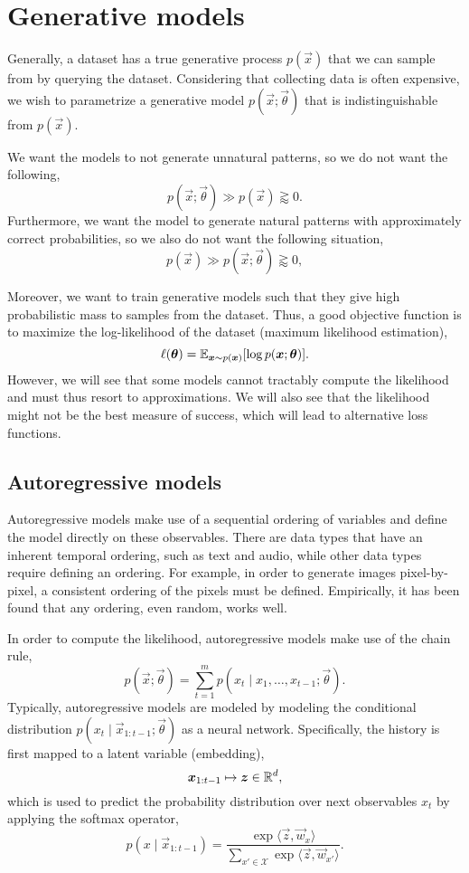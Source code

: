 \section{Generative models}

Generally, a dataset has a true generative process $p(\vec{x})$ that we can sample from by querying
the dataset. Considering that collecting data is often expensive, we wish to parametrize a
generative model $p(\vec{x}; \vec{\theta})$ that is indistinguishable from $p(\vec{x})$.

We want the models to not generate unnatural patterns, so we do not want the following, \[
    p(\vec{x}; \vec{\theta}) \gg p(\vec{x}) \gtrapprox 0.
\]
Furthermore, we want the model to generate natural patterns with approximately correct
probabilities, so we also do not want the following situation, \[
    p(\vec{x}) \gg p(\vec{x}; \vec{\theta}) \gtrapprox 0,
\]

Moreover, we want to train generative models such that they give high probabilistic mass to samples
from the dataset. Thus, a good objective function is to maximize the log-likelihood of the dataset
(maximum likelihood estimation), \[
    \ell(\bm{\theta}) = \mathbb{E}_{\bm{x} \sim p(\bm{x})}[\log p(\bm{x}; \bm{\theta})].
\]
However, we will see that some models cannot tractably compute the likelihood and must thus resort
to approximations. We will also see that the likelihood might not be the best measure of success,
which will lead to alternative loss functions.

\subsection{Autoregressive models}

Autoregressive models make use of a sequential ordering of variables and define the model directly
on these observables. There are data types that have an inherent temporal ordering, such as text
and audio, while other data types require defining an ordering. For example, in order to generate
images pixel-by-pixel, a consistent ordering of the pixels must be defined. Empirically, it has
been found that any ordering, even random, works well.

In order to compute the likelihood, autoregressive models make use of the chain rule, \[
    p(\vec{x}; \vec{\theta}) = \sum_{t=1}^{m} p(x_t \mid x_1, \ldots, x_{t-1}; \vec{\theta}).
\]
Typically, autoregressive models are modeled by modeling the conditional distribution $p(x_t \mid
    \vec{x}_{1:t-1}; \vec{\theta})$ as a neural network. Specifically, the history is first mapped to a
latent variable (embedding), \[
    \bm{x}_{1:t-1} \mapsto \bm{z} \in \mathbb{R}^d,
\]
which is used to predict the probability distribution over next observables $x_t$ by applying the
softmax operator, \[
    p(x \mid \vec{x}_{1:t-1}) = \frac{\exp \langle \vec{z}, \vec{w}_x \rangle}{\sum_{x' \in \mathcal{X}} \exp \langle \vec{z}, \vec{w}_{x'} \rangle}.
\]


